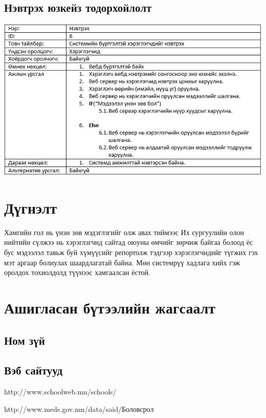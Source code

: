 \documentclass[
oneside, %
english, %
onehalfspacing, %
nolistspacing, %
headsepline, %
]{article} %
\begin{document}
     \subsection{Нэвтрэх юзкейз тодорхойлолт}
     \includegraphics[width=\textwidth]{usecaseT6}
     
     \section{Дүгнэлт}
     Хамгийн гол нь үнэн зөв мэдэглэгийг олж авах тиймээс Их сургуулийн олон нийтийн сүлжээ нь хэрэглэгчид сайтад оюуны өмчийг зөрчиж байгаа болоод ёс бус мэдээлэл тавьж буй хүмүүсийг репортолж тэдгээр хэрэглэгчидийг түгжих гэх мэт аргаар болиулах шаардлагатай  байна. Мөн системрүү хадлага хийх гэж оролдох тохиолдолд түүнээс хамгаалсан ёстой.
    
     
     \section{Ашигласан бүтээлийн жагсаалт}
     \subsection{Ном зүй}
     \subsection{Вэб сайтууд}
     http://www.schoolweb.mn/schools/
     
     http://www.meds.gov.mn/data/said/Боловсрол%
     
\end{document}
